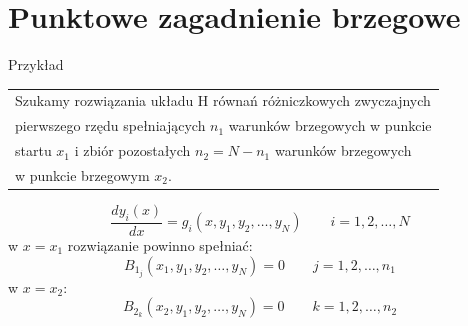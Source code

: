 \section{Punktowe zagadnienie brzegowe}
\begin{frame}{Przykład}
	\begin{tabular}{|l}
	Szukamy rozwiązania układu H równań różniczkowych zwyczajnych \\
    pierwszego rzędu spełniających $n_1$ warunków brzegowych w punkcie \\
    startu $x_1$ i zbiór pozostałych $n_2 = N-n_1$ warunków brzegowych \\
    w punkcie brzegowym $x_2$.
	\end{tabular}
    $$\frac{dy_i(x)}{dx}= g_i(x, y_1, y_2,\ldots, y_N)\qquad i = 1,2, \ldots, N$$
	w $x = x_1$ rozwiązanie powinno spełniać: \newline
    $$B_{1_j}(x_1, y_1, y_2,\ldots, y_N) = 0\qquad j = 1,2, \ldots, n_1 $$
	w $x = x_2$:
    $$B_{2_k}(x_2, y_1, y_2,\ldots, y_N) = 0 \qquad k = 1,2, \ldots, n_2 $$
\end{frame}
